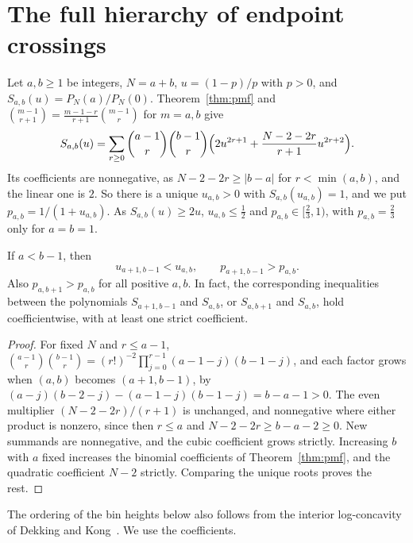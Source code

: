 \section{The full hierarchy of endpoint crossings}\label{sec:allbin}

Let $a,b\ge1$ be integers, $N=a+b$, $u=(1-p)/p$ with $p>0$, and
$S_{a,b}(u)=P_N(a)/P_N(0)$. Theorem~\ref{thm:pmf} and
$\binom{m-1}{r+1}=\frac{m-1-r}{r+1}\binom{m-1}{r}$ for $m=a,b$ give
\begin{equation}\label{eq:allbin-polynomial}
 S_{a,b}(u)=\sum_{r\ge0}\binom{a-1}{r}\binom{b-1}{r}
 \Bigl(2u^{2r+1}+\frac{N-2-2r}{r+1}u^{2r+2}\Bigr).
\end{equation}
Its coefficients are nonnegative, as $N-2-2r\ge|b-a|$ for $r<\min(a,b)$,
and the linear one is $2$. So there is a unique $u_{a,b}>0$ with
$S_{a,b}(u_{a,b})=1$, and we put $p_{a,b}=1/(1+u_{a,b})$. As $S_{a,b}(u)\ge2u$,
$u_{a,b}\le\frac12$ and $p_{a,b}\in[\frac23,1)$, with $p_{a,b}=\frac23$ only for
$a=b=1$.

\begin{proposition}\label{prop:allbin-order}
If $a<b-1$, then
\[
 u_{a+1,b-1}<u_{a,b},\qquad p_{a+1,b-1}>p_{a,b}.
\]
Also $p_{a,b+1}>p_{a,b}$ for all positive $a,b$.
In fact, the corresponding inequalities between the polynomials
$S_{a+1,b-1}$ and $S_{a,b}$, or $S_{a,b+1}$ and $S_{a,b}$, hold
coefficientwise, with at least one strict coefficient.
\end{proposition}
\begin{proof}
For fixed $N$ and $r\le a-1$,
$\binom{a-1}{r}\binom{b-1}{r}=(r!)^{-2}\prod_{j=0}^{r-1}(a-1-j)(b-1-j)$, and
each factor grows when $(a,b)$ becomes $(a+1,b-1)$, by
$(a-j)(b-2-j)-(a-1-j)(b-1-j)=b-a-1>0$. The even multiplier $(N-2-2r)/(r+1)$
is unchanged, and nonnegative where either product is nonzero, since then
$r\le a$ and $N-2-2r\ge b-a-2\ge0$. New summands are nonnegative, and the
cubic coefficient grows strictly. Increasing $b$ with $a$
fixed increases the binomial coefficients of Theorem~\ref{thm:pmf}, and the
quadratic coefficient $N-2$ strictly. Comparing the unique roots proves the rest.
\end{proof}

The ordering of the bin heights below also follows from the interior
log-concavity of Dekking and Kong~\cite[Proposition~4.3]{dekkingkong2011}.
We use the coefficients.

